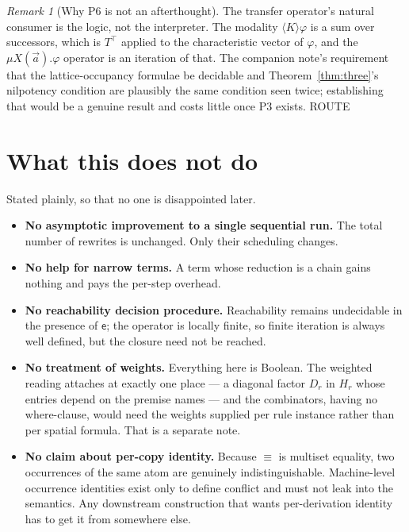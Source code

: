 \documentclass[11pt,a4paper]{article}
\theoremstyle{plain}
\theoremstyle{definition}
\theoremstyle{remark}
\newtheorem{remark}[theorem]{Remark}
\newcommand{\scong}{\equiv}
\newcommand{\ev}{\mathsf{e}}
\begin{document}
\begin{remark}[Why P6 is not an afterthought]
The transfer operator's natural consumer is the logic, not the interpreter.
The modality $\langle K\rangle\varphi$ is a sum over successors, which is
$T^{\top}$ applied to the characteristic vector of $\varphi$, and the
$\mu X(\vec{a}).\varphi$ operator is an iteration of that. The companion
note's requirement that the lattice-occupancy formulae be decidable and
Theorem~\ref{thm:three}'s nilpotency condition are plausibly the same
condition seen twice; establishing that would be a genuine result and costs
little once P3 exists. \textsf{ROUTE}
\end{remark}

\section{What this does not do}
\label{sec:notdo}

Stated plainly, so that no one is disappointed later.

\begin{itemize}[leftmargin=1.6em]
\item \textbf{No asymptotic improvement to a single sequential run.} The total
  number of rewrites is unchanged. Only their scheduling changes.
\item \textbf{No help for narrow terms.} A term whose reduction is a chain
  gains nothing and pays the per-step overhead.
\item \textbf{No reachability decision procedure.} Reachability remains
  undecidable in the presence of $\ev$; the operator is locally finite, so
  finite iteration is always well defined, but the closure need not be reached.
\item \textbf{No treatment of weights.} Everything here is Boolean. The
  weighted reading attaches at exactly one place --- a diagonal factor
  $D_r$ in $H_r$ whose entries depend on the premise names --- and the
  combinators, having no where-clause, would need the weights supplied per
  rule instance rather than per spatial formula. That is a separate note.
\item \textbf{No claim about per-copy identity.} Because $\scong$ is multiset
  equality, two occurrences of the same atom are genuinely indistinguishable.
  Machine-level occurrence identities exist only to define conflict and must
  not leak into the semantics. Any downstream construction that wants
  per-derivation identity has to get it from somewhere else.
\end{itemize}
\end{document}
